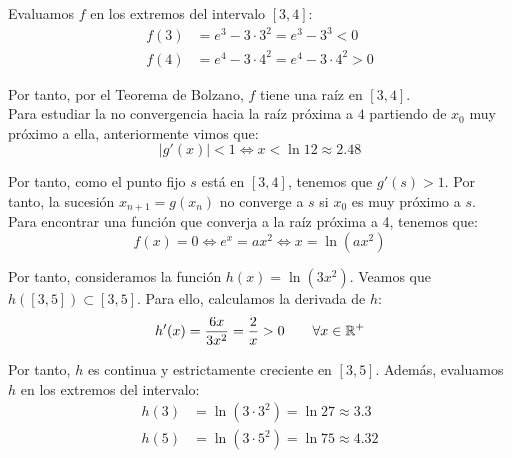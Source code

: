 \begin{ejercicio}
\begin{enumerate}
        Evaluamos $f$ en los extremos del intervalo $[3,4]$:
        \begin{align*}
            f(3) &= e^3 - 3\cdot 3^2 = e^3 - 3^3<0\\
            f(4) &= e^4 - 3\cdot 4^2 = e^4 - 3\cdot 4^2>0
        \end{align*}

        Por tanto, por el Teorema de Bolzano, $f$ tiene una raíz en $[3,4]$.\\

        Para estudiar la no convergencia hacia la raíz próxima a $4$ partiendo de $x_0$ muy próximo a ella, anteriormente vimos que:
        \begin{equation*}
            |g'(x)|<1\iff x<\ln 12\approx 2.48
        \end{equation*}

        Por tanto, como el punto fijo $s$ está en $[3,4]$, tenemos que $g'(s)>1$. Por tanto, la sucesión $x_{n+1}=g(x_n)$ no converge a $s$ si $x_0$ es muy próximo a $s$.\\

        Para encontrar una función que converja a la raíz próxima a 4, tenemos que:
        \begin{equation*}
            f(x)=0\iff
            e^x=ax^2\iff
            x=\ln(ax^2)
        \end{equation*}

        Por tanto, consideramos la función $h(x)=\ln(3x^2)$. Veamos que $h\left([3,5]\right)\subset [3,5]$. Para ello, calculamos la derivada de $h$:
        \begin{align*}
            h'(x) = \dfrac{6x}{3x^2} = \dfrac{2}{x}>0\qquad \forall x\in \mathbb{R}^+
        \end{align*}

        Por tanto, $h$ es continua y estrictamente creciente en $[3,5]$. Además, evaluamos $h$ en los extremos del intervalo:
        \begin{align*}
            h(3) &= \ln(3\cdot 3^2) = \ln 27\approx 3.3\\
            h(5) &= \ln(3\cdot 5^2) = \ln 75\approx 4.32
        \end{align*}


\end{enumerate}
\end{ejercicio}
